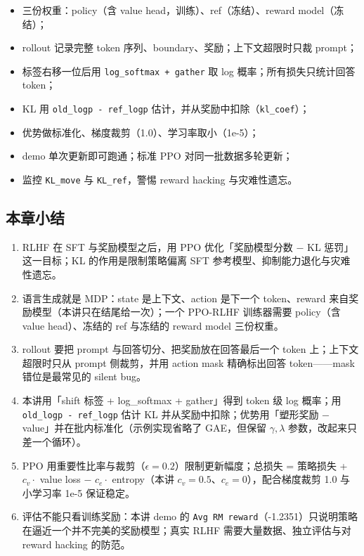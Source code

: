 \begin{itemize}
\item 三份权重：policy（含 value head，训练）、ref（冻结）、reward model（冻结）；
\item rollout 记录完整 token 序列、boundary、奖励；上下文超限时只裁 prompt；
\item 标签右移一位后用 \texttt{log\_softmax + gather} 取 log 概率；所有损失只统计回答 token；
\item KL 用 \texttt{old\_logp - ref\_logp} 估计，并从奖励中扣除（\texttt{kl\_coef}）；
\item 优势做标准化、梯度裁剪（1.0）、学习率取小（1e-5）；
\item demo 单次更新即可跑通；标准 PPO 对同一批数据多轮更新；
\item 监控 \texttt{KL\_move} 与 \texttt{KL\_ref}，警惕 reward hacking 与灾难性遗忘。
\end{itemize}

\subsection{本章小结}

\begin{enumerate}
\item RLHF 在 SFT 与奖励模型之后，用 PPO 优化「奖励模型分数 − KL 惩罚」这一目标；KL 的作用是限制策略偏离 SFT 参考模型、抑制能力退化与灾难性遗忘。
\item 语言生成就是 MDP：state 是上下文、action 是下一个 token、reward 来自奖励模型（本讲只在结尾给一次）；一个 PPO-RLHF 训练器需要 policy（含 value head）、冻结的 ref 与冻结的 reward model 三份权重。
\item rollout 要把 prompt 与回答切分、把奖励放在回答最后一个 token 上；上下文超限时只从 prompt 侧裁剪，并用 action mask 精确标出回答 token——mask 错位是最常见的 silent bug。
\item 本讲用「shift 标签 + log\_softmax + gather」得到 token 级 log 概率；用 \texttt{old\_logp - ref\_logp} 估计 KL 并从奖励中扣除；优势用「塑形奖励 − value」并在批内标准化（示例实现省略了 GAE，但保留 $\gamma,\lambda$ 参数，改起来只差一个循环）。
\item PPO 用重要性比率与裁剪（$\epsilon=0.2$）限制更新幅度；总损失 = 策略损失 + $c_v\cdot$ value loss − $c_e\cdot$ entropy（本讲 $c_v=0.5$、$c_e=0$），配合梯度裁剪 1.0 与小学习率 1e-5 保证稳定。
\item 评估不能只看训练奖励：本讲 demo 的 \texttt{Avg RM reward}（-1.2351）只说明策略在逼近一个并不完美的奖励模型；真实 RLHF 需要大量数据、独立评估与对 reward hacking 的防范。
\end{enumerate}
